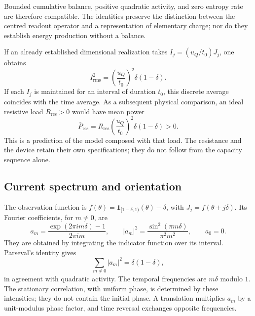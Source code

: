 Bounded cumulative balance, positive quadratic activity, and zero
entropy rate are therefore compatible. The identities preserve the
distinction between the centred readout operator and a representation of elementary
charge; nor do they establish energy production without a balance.

If an already established dimensional realization takes
$I_j=(u_Q/t_0)J_j$, one obtains
\begin{equation}
 I_{\mathrm{rms}}^2
 =\left(\frac{u_Q}{t_0}\right)^2\delta(1-\delta).
 \label{md:cron:eficaz}
\end{equation}
If each $I_j$ is maintained for an interval of duration $t_0$, this
discrete average coincides with the time average.
As a subsequent physical comparison, an ideal resistive load
$R_{\mathrm{res}}>0$ would have mean power
\begin{equation}
 \overline P_{\mathrm{res}}
 =R_{\mathrm{res}}\left(\frac{u_Q}{t_0}\right)^2
 \delta(1-\delta)>0.
 \label{md:cron:potencia-resistiva}
\end{equation}
This is a prediction of the model composed with that load. The resistance and
the device retain their own specifications; they do not follow from the
capacity sequence alone.

\subsection{Current spectrum and orientation}
\label{md:cron:espectro}

The observation function is
$f(\theta)=\mathbf1_{[1-\delta,1)}(\theta)-\delta$, with
$J_j=f(\theta+j\delta)$. Its Fourier coefficients, for $m\neq0$, are
\begin{equation}
 a_m=\frac{\exp(2\pi i m\delta)-1}{2\pi i m},\qquad
 |a_m|^2=\frac{\sin^2(\pi m\delta)}{\pi^2m^2},\qquad
 a_0=0.
 \label{md:cron:fourier}
\end{equation}
They are obtained by integrating the indicator function over its interval. Parseval's
identity gives
\begin{equation}
 \sum_{m\neq0}|a_m|^2=\delta(1-\delta),
 \label{md:cron:parseval}
\end{equation}
in agreement with quadratic activity. The temporal frequencies
are $m\delta$ modulo $1$. The stationary correlation, with uniform phase,
is determined by these intensities; they do not contain the initial phase.
A translation multiplies $a_m$ by a unit-modulus phase factor, and time
reversal exchanges opposite frequencies.

